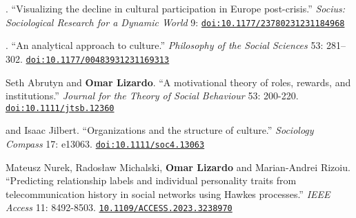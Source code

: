
. ``Visualizing the decline in cultural participation in Europe post-crisis.'' {\em Socius: Sociological Research for a Dynamic World} 9: \href{https://doi.org/10.1177/23780231231184968}{\nolinkurl{doi:10.1177/23780231231184968}}

. ``An analytical approach to culture.'' {\em Philosophy of the Social Sciences} 53: 281–302. \href{https://doi.org/10.1177/00483931231169313}{\nolinkurl{doi:10.1177/00483931231169313}}

\ind Seth Abrutyn and {\bf Omar Lizardo}. ``A motivational theory of roles, rewards, and institutions.'' {\em Journal for the Theory of Social Behaviour} 53: 200-220. \href{https://doi.org/10.1111/jtsb.12360}{\nolinkurl{doi:10.1111/jtsb.12360}}

 and Isaac Jilbert. ``Organizations and the structure of culture.'' {\em Sociology Compass} 17: e13063. \href{https://doi.org/10.1111/soc4.13063}{\nolinkurl{doi:10.1111/soc4.13063}}

\ind Mateusz Nurek, Rados\l{}aw Michalski, {\bf Omar Lizardo} and Marian-Andrei Rizoiu. ``Predicting relationship labels and individual personality traits from telecommunication history in social networks using Hawkes processes.'' {\em IEEE Access} 11: 8492-8503. \href{https://doi.org/10.1109/ACCESS.2023.3238970}{\nolinkurl{10.1109/ACCESS.2023.3238970}}
